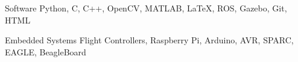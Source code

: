 

\begin{cvskills}

  \cvskill
    {Software} %
    {Python, C, C++, OpenCV, MATLAB, LaTeX, ROS, Gazebo, Git, HTML} %

  \cvskill
    {Embedded Systems} %
    {Flight Controllers, Raspberry Pi, Arduino, AVR, SPARC, EAGLE, BeagleBoard} %


\end{cvskills}
